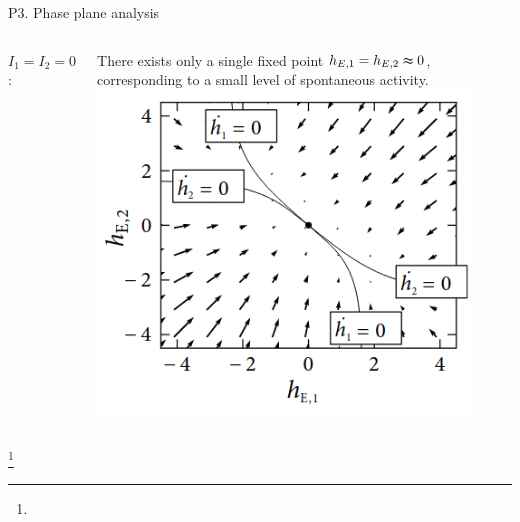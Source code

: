 \documentclass[xcolor=table,dvipsnames,svgnames,aspectratio=169,fontset=fandol]{ctexbeamer}
\begin{document}
\begin{frame}{P3. Phase plane analysis}
  \begin{columns}
    \textbf{$I_1=I_2=0$}:

    \vskip 12pt
    There exists only a single fixed point $h_{E,1} = h_{E,2} \thickapprox  0$, corresponding to a small level of spontaneous activity.
    \includegraphics[width=0.9\textwidth,height=0.8\textheight]{phase1.png}
  \end{columns}\footnote{}   
\end{frame}
\end{document}
